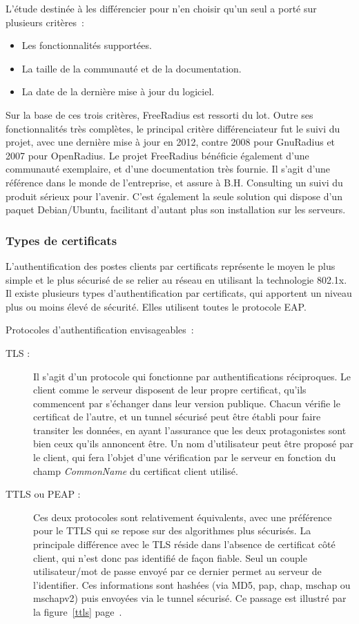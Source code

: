 L'étude destinée à les différencier pour n'en choisir qu'un seul a porté sur plusieurs critères~:

\begin{itemize}
\item Les fonctionnalités supportées.
\item La taille de la communauté et de la documentation.
\item La date de la dernière mise à jour du logiciel.
\end{itemize}

Sur la base de ces trois critères, FreeRadius est ressorti du lot. Outre ses fonctionnalités très complètes, le principal critère différenciateur fut le suivi du projet, avec une dernière mise à jour en 2012, contre 2008 pour GnuRadius et 2007 pour OpenRadius. Le projet FreeRadius bénéficie également d'une communauté exemplaire, et d'une documentation très fournie. Il s'agit d'une référence dans le monde de l'entreprise, et assure à B.H. Consulting un suivi du produit sérieux pour l'avenir. C'est également la seule solution qui dispose d'un paquet Debian/Ubuntu, facilitant d'autant plus son installation sur les serveurs.

\subsubsection{Types de certificats}

L'authentification des postes clients par certificats représente le moyen le plus simple et le plus sécurisé de se relier au réseau en utilisant la technologie 802.1x. Il existe plusieurs types d'authentification par certificats, qui apportent un niveau plus ou moins élevé de sécurité. Elles utilisent toutes le protocole EAP.

Protocoles d'authentification envisageables~:

\begin{description}
\item[TLS :] Il s'agit d'un protocole qui fonctionne par authentifications réciproques. Le client comme le serveur disposent de leur propre certificat, qu'ils commencent par s'échanger dans leur version publique. Chacun vérifie le certificat de l'autre, et un tunnel sécurisé peut être établi pour faire transiter les données, en ayant l'assurance que les deux protagonistes sont bien ceux qu'ils annoncent être. Un nom d'utilisateur peut être proposé par le client, qui fera l'objet d'une vérification par le serveur en fonction du champ \textit{CommonName} du certificat client utilisé.
\item[TTLS ou PEAP :] Ces deux protocoles sont relativement équivalents, avec une préférence pour le TTLS qui se repose sur des algorithmes plus sécurisés. La principale différence avec le TLS réside dans l'absence de certificat côté client, qui n'est donc pas identifié de façon fiable. Seul un couple utilisateur/mot de passe envoyé par ce dernier permet au serveur de l'identifier. Ces informations sont hashées (via MD5, pap, chap, mschap ou mschapv2) puis envoyées via le tunnel sécurisé. Ce passage est illustré par la figure~\ref{ttls} page~\pageref{ttls}.
\end{description}

